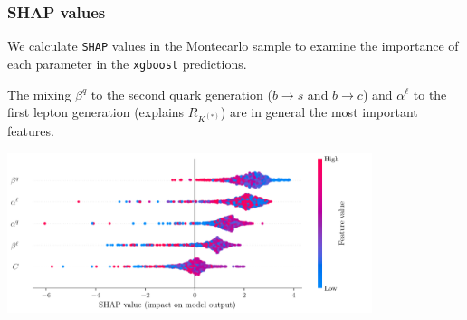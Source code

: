 \documentclass[mathserif, 10pt, dvipsnames]{beamer}
\begin{document}
\begin{frame}\frametitle{SHAP values}

    We calculate \texttt{SHAP} values in the Montecarlo sample to examine the importance of each parameter in the \texttt{xgboost} predictions.

    \vspace{0.5cm}

    The mixing \(\beta^q\) to the second quark generation ($b\to s$ and $b \to c$) and $\alpha^\ell$ to the first lepton generation (explains $R_{K^{(*)}}$) are in general the most important features.
    \begin{center}
        \includegraphics[width=0.8\textwidth]{figures/SHAP_summary.pdf}
    \end{center}
\end{frame}
\end{document}
